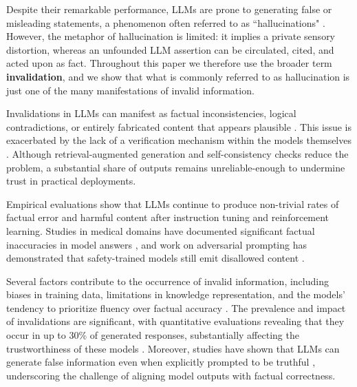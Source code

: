 \documentclass[12pt]{article}
\theoremstyle{definition}
\begin{document}
Despite their remarkable performance, LLMs are prone to generating false or misleading statements, a phenomenon often referred to as ``hallucinations" \parencite{ji2022survey}. However,  the metaphor of hallucination is limited: it implies a private sensory distortion, whereas an unfounded LLM assertion can be circulated, cited, and acted upon as fact.  Throughout this paper we therefore use the broader term
\textbf{invalidation}, and we show that what is commonly referred to as  hallucination is just one of the many manifestations of invalid information.

Invalidations in LLMs can manifest as factual inconsistencies, logical contradictions, or entirely fabricated content that appears plausible \parencite{maynez2020faithfulness}. This issue is exacerbated by the lack of a verification mechanism within the models themselves \parencite{bender2021dangers, weidinger2021ethical}. Although retrieval-augmented generation and self-consistency checks \parencite{lewis2020retrieval,wang2023self} reduce the problem, a substantial share of outputs remains unreliable-enough to undermine trust in practical deployments.

Empirical evaluations show that LLMs continue to produce non-trivial rates of factual error and harmful content after instruction tuning and reinforcement learning. Studies in medical domains have documented significant factual inaccuracies in model answers \cite{thirunavukarasu2023large,sallam2023chatgpt}, and work on adversarial prompting has demonstrated that safety-trained models still emit disallowed content \cite{zou2023universal,chao2023jailbreaking}. 

Several factors contribute to the occurrence of invalid information, including biases in training data, limitations in knowledge representation, and the models' tendency to prioritize fluency over factual accuracy \parencite{lin2022truthfulqa}. The prevalence and impact of invalidations are significant, with quantitative evaluations revealing that they occur in up to 30\% of generated responses, substantially affecting the trustworthiness of these models \parencite{ji2022survey, lin2022truthfulqa}. Moreover, studies have shown that LLMs can generate false information even when explicitly prompted to be truthful \parencite{evans2021truthful}, underscoring the challenge of aligning model outputs with factual correctness.
\end{document}

